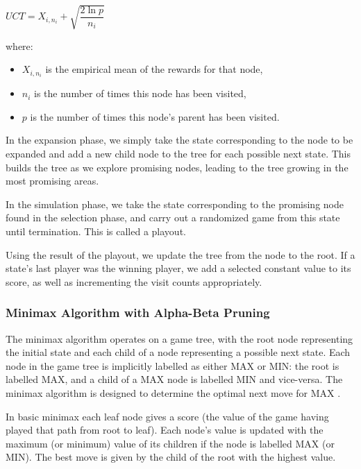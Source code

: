\begin{center}
 \( UCT = X_{i, n_i} + \sqrt{\dfrac{2\ln p}{n_{i}}}\) 
 
\end{center}
 where:

\begin{itemize}
    \item $X_{i, n_i}$ is the empirical mean of the rewards for that node,
    \item $n_{i}$ is the number of times this node has been visited,
    \item $p$ is the number of times this node's parent has been visited.
\end{itemize}





In the expansion phase, we simply take the state corresponding to the node to be expanded and add a new child node to the tree for each possible next state. This builds the tree as we explore promising nodes, leading to the tree growing in the most promising areas.

In the simulation phase, we take the state corresponding to the promising node found in the selection phase, and carry out a randomized game from this state until termination. This is called a playout.

Using the result of the playout, we update the tree from the node to the root. If a state's last player was the winning player, we add a selected constant value to its score, as well as incrementing the visit counts appropriately.

\subsubsection{Minimax Algorithm with Alpha-Beta Pruning}


The minimax algorithm operates on a game tree, with the root node representing the initial state and each child of a node representing a possible next state. Each node in the game tree is implicitly labelled as either MAX or MIN: the root is labelled MAX, and a child of a MAX node is labelled MIN and vice-versa. The minimax algorithm is designed to determine the optimal next move for MAX \cite{AIModernApproach}.

In basic minimax each leaf node gives a score (the value of the game having played that path from root to leaf). Each node's value is updated with the maximum (or minimum) value of its children if the node is labelled MAX (or MIN). The best move is given by the child of the root with the highest value.

